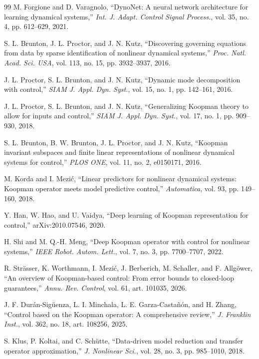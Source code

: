 \documentclass[journal]{IEEEtran}
\begin{document}
\begin{thebibliography}{99}
M. Forgione and D. Varagnolo, ``DynoNet: A neural network architecture for learning dynamical systems,'' \emph{Int. J. Adapt. Control Signal Process.}, vol. 35, no. 4, pp. 612--629, 2021.

S. L. Brunton, J. L. Proctor, and J. N. Kutz, ``Discovering governing equations from data by sparse identification of nonlinear dynamical systems,'' \emph{Proc. Natl. Acad. Sci. USA}, vol. 113, no. 15, pp. 3932--3937, 2016.

J. L. Proctor, S. L. Brunton, and J. N. Kutz, ``Dynamic mode decomposition with control,'' \emph{SIAM J. Appl. Dyn. Syst.}, vol. 15, no. 1, pp. 142--161, 2016.

J. L. Proctor, S. L. Brunton, and J. N. Kutz, ``Generalizing Koopman theory to allow for inputs and control,'' \emph{SIAM J. Appl. Dyn. Syst.}, vol. 17, no. 1, pp. 909--930, 2018.

S. L. Brunton, B. W. Brunton, J. L. Proctor, and J. N. Kutz, ``Koopman invariant subspaces and finite linear representations of nonlinear dynamical systems for control,'' \emph{PLOS ONE}, vol. 11, no. 2, e0150171, 2016.

M. Korda and I. Mezi\'c, ``Linear predictors for nonlinear dynamical systems: Koopman operator meets model predictive control,'' \emph{Automatica}, vol. 93, pp. 149--160, 2018.

Y. Han, W. Hao, and U. Vaidya, ``Deep learning of Koopman representation for control,'' arXiv:2010.07546, 2020.

H. Shi and M. Q.-H. Meng, ``Deep Koopman operator with control for nonlinear systems,'' \emph{IEEE Robot. Autom. Lett.}, vol. 7, no. 3, pp. 7700--7707, 2022.

R. Str\"asser, K. Worthmann, I. Mezi\'c, J. Berberich, M. Schaller, and F. Allg\"ower, ``An overview of Koopman-based control: From error bounds to closed-loop guarantees,'' \emph{Annu. Rev. Control}, vol. 61, art. 101035, 2026.

J. F. Dur\'an-Sig\"uenza, L. I. Minchala, L. E. Garza-Casta\~n\'on, and H. Zhang, ``Control based on the Koopman operator: A comprehensive review,'' \emph{J. Franklin Inst.}, vol. 362, no. 18, art. 108256, 2025.

S. Klus, P. Koltai, and C. Sch\"utte, ``Data-driven model reduction and transfer operator approximation,'' \emph{J. Nonlinear Sci.}, vol. 28, no. 3, pp. 985--1010, 2018.


\end{thebibliography}
\end{document}
